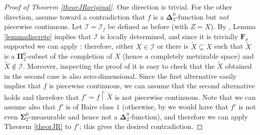 \documentclass{rae}
\newcommand{\I}{\mathcal{I}}
\newcommand{\bSigma}{\mathbf{\Sigma}}
\newcommand{\bPi}{\mathbf{\Pi}}
\newcommand{\bDelta}{\mathbf{\Delta}}
\newcommand{\restr}[2]{#1 \restriction #2}
\theoremstyle{definition}
\begin{document}
\begin{proof}[Proof of Theorem \ref{theorJRoriginal}]
One direction is trivial. For the other direction, assume toward a
contradiction 
that $f$ is a $\bDelta^0_2$-function but
\emph{not} piecewise continuous. Let $\I = \I_f$ be defined as before (with $Z = X$).
By  \cite[Proposition 3.5]{zeleny}, Lemma \ref{lemmadiscrete} implies that $\I$ is
locally determined, and since it is trivially $\boldsymbol{F}_\sigma$
supported we can apply \cite[Theorem 1.3]{zeleny}: therefore, either
$X \in \I$ or there is $\tilde{X} \subseteq X$ such that $\tilde{X}$ is a  $\bPi^0_2$-subset of the completion of $X$
(hence a completely metrizable space) and $\tilde{X} \notin \I$. Moreover, inspecting
the proof of  \cite[Theorem 1.3]{zeleny} it is easy to check that the $\tilde{X}$
obtained in the second case is also zero-dimensional.
Since the first alternative easily implies that $f$ is piecewise continuous,
we can assume that the second alternative holds and therefore that
$f' = \restr{f}{\tilde{X}}$ is not piecewise continuous. Note that we can assume
also that $f'$ is of Baire class $1$ (otherwise, by \cite[Theorem 8]{hansell} we would have that $f'$ is not 
even $\bSigma^0_2$-measurable and hence not a $\bDelta^0_2$-function), 
and therefore we can apply Theorem \ref{theorJR} to $f'$; this gives
the desired contradiction.
\end{proof}
\end{document}
